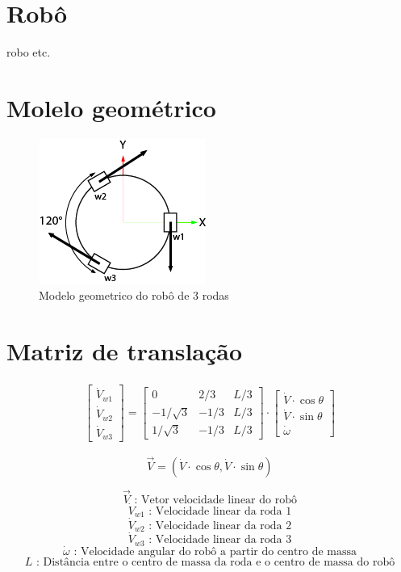 
\section{Robô}
robo etc.

\section{Molelo geométrico}

\begin{figure}[h]
	\centering
	\includegraphics{figures/model}
	\caption{Modelo geometrico do robô de 3 rodas}
	\label{lof}
\end{figure}

\section{Matriz de translação}

\begin{gather}
	\begin{bmatrix} \dot{V}_{w1} \\  \dot{V}_{w2} \\  \dot{V}_{w3} \end{bmatrix}
	=
	\begin{bmatrix}
		0 & 2/3 & L/3 \\
		-1/\sqrt{3} & -1/3 & L/3\\
		1/\sqrt{3} & -1/3 & L/3
	\end{bmatrix}
	\cdot
	\begin{bmatrix} \dot{V}\cdot \cos{\theta} \\  \dot{V}\cdot \sin{\theta} \\  \dot{\omega} \end{bmatrix}
\end{gather}

\[ \overrightarrow{V} = (\dot{V}\cdot \cos{\theta} , \dot{V}\cdot \sin{\theta}) \]



\[\overrightarrow{V} \text{ :  Vetor velocidade linear do robô} \]  
\[\dot{V}_{w1}   \text{ :  Velocidade linear da roda 1} \]  
\[\dot{V}_{w2}   \text{ :  Velocidade linear da roda 2} \]  
\[\dot{V}_{w3}   \text{ :  Velocidade linear da roda 3} \] 
\[\dot{\omega}   \text{ :  Velocidade angular do robô a partir do centro de massa} \]  
\[L   \text{ :  Distância entre o centro de massa da roda e o centro de massa do robô} \]  



